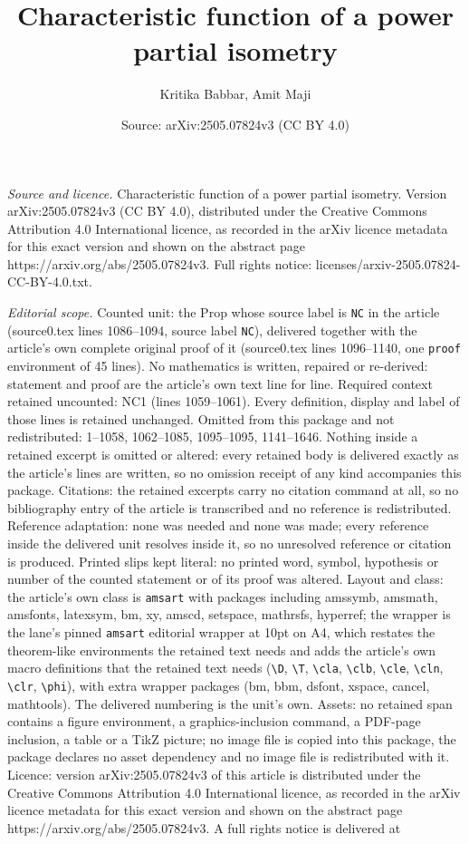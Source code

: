 \documentclass[10pt,a4paper]{amsart}
\title[Characteristic function of a power partial isometry]{Characteristic function of a power partial isometry}
\author{Kritika Babbar, Amit Maji}
\date{Source: arXiv:2505.07824v3 (CC BY 4.0)}
\begin{document}
\maketitle

\noindent\emph{Source and licence.} Characteristic function of a power partial isometry. Version arXiv:2505.07824v3 (CC BY 4.0), distributed under the Creative Commons Attribution 4.0 International licence, as recorded in the arXiv licence metadata for this exact version and shown on the abstract page https://arxiv.org/abs/2505.07824v3. Full rights notice: licenses/arxiv-2505.07824-CC-BY-4.0.txt.\par\smallskip

\noindent\textit{Editorial scope.} Counted unit: the Prop whose source label is \texttt{NC} in the article (source0.tex lines 1086--1094, source label \texttt{NC}), delivered together with the article's own complete original proof of it (source0.tex lines 1096--1140, one \texttt{proof} environment of 45 lines). No mathematics is written, repaired or re-derived: statement and proof are the article's own text line for line. Required context retained uncounted: NC1 (lines 1059--1061). Every definition, display and label of those lines is retained unchanged. Omitted from this package and not redistributed: 1--1058, 1062--1085, 1095--1095, 1141--1646. Nothing inside a retained excerpt is omitted or altered: every retained body is delivered exactly as the article's lines are written, so no omission receipt of any kind accompanies this package. Citations: the retained excerpts carry no citation command at all, so no bibliography entry of the article is transcribed and no reference is redistributed. Reference adaptation: none was needed and none was made; every reference inside the delivered unit resolves inside it, so no unresolved reference or citation is produced. Printed slips kept literal: no printed word, symbol, hypothesis or number of the counted statement or of its proof was altered. Layout and class: the article's own class is \texttt{amsart} with packages including amssymb, amsmath, amsfonts, latexsym, bm, xy, amscd, setspace, mathrsfs, hyperref; the wrapper is the lane's pinned \texttt{amsart} editorial wrapper at 10pt on A4, which restates the theorem-like environments the retained text needs and adds the article's own macro definitions that the retained text needs (\texttt{\textbackslash D}, \texttt{\textbackslash T}, \texttt{\textbackslash cla}, \texttt{\textbackslash clb}, \texttt{\textbackslash cle}, \texttt{\textbackslash cln}, \texttt{\textbackslash clr}, \texttt{\textbackslash phi}), with extra wrapper packages (bm, bbm, dsfont, xspace, cancel, mathtools). The delivered numbering is the unit's own. Assets: no retained span contains a figure environment, a graphics-inclusion command, a PDF-page inclusion, a table or a TikZ picture; no image file is copied into this package, the package declares no asset dependency and no image file is redistributed with it. Licence: version arXiv:2505.07824v3 of this article is distributed under the Creative Commons Attribution 4.0 International licence, as recorded in the arXiv licence metadata for this exact version and shown on the abstract page https://arxiv.org/abs/2505.07824v3. A full rights notice is delivered at 
\end{document}
